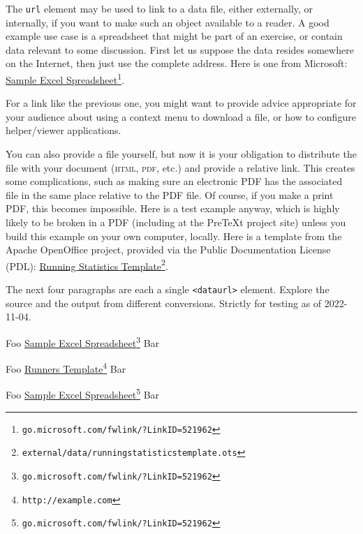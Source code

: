 \documentclass{sn-jnl}
\theoremstyle{thmstyleone}%
\theoremstyle{thmstyletwo}%
\theoremstyle{thmstylethree}%
\newcommand{\mono}[1]{\texttt{#1}}
\newcommand{\initialism}[1]{\textsc{\MakeLowercase{#1}}}
\numberwithin{equation}{section}
\begin{document}
The \mono{url} element may be used to link to a data file, either externally, or internally, if you want to make such an object available to a reader.  A good example use case is a spreadsheet that might be part of an exercise, or contain data relevant to some discussion.  First let us suppose the data resides somewhere on the Internet, then just use the complete address.  Here is one from Microsoft: \href{http://go.microsoft.com/fwlink/?LinkID=521962}{Sample Excel Spreadsheet}\footnote{\nolinkurl{go.microsoft.com/fwlink/?LinkID=521962}\label{section-cross-referencing-16-5}}.%
\par
For a link like the previous one, you might want to provide advice appropriate for your audience about using a context menu to download a file, or how to configure helper\slash{}viewer applications.%
\par
You can also provide a file yourself, but now it is your obligation to distribute the file with your document (\initialism{HTML}, \initialism{PDF}, etc.\@) and provide a relative link.  This creates some complications, such as making sure an electronic PDF has the associated file in the same place relative to the PDF file.  Of course, if you make a print PDF, this becomes impossible.  Here is a test example anyway, which is highly likely to be broken in a PDF (including at the PreTeXt project site) unless you build this example on your own computer, locally.  Here is a template from the Apache OpenOffice project, provided via the Public Documentation License (PDL):  \href{external/data/runningstatisticstemplate.ots}{Running Statistics Template}\footnote{\nolinkurl{external/data/runningstatisticstemplate.ots}\label{section-cross-referencing-18-6}}.%
\par
The next four paragraphs are each a single \mono{<dataurl>} element.  Explore the source and the output from different conversions.  Strictly for testing as of 2022-11-04.%
\par
Foo \href{http://go.microsoft.com/fwlink/?LinkID=521962}{Sample Excel Spreadsheet}\footnote{\nolinkurl{go.microsoft.com/fwlink/?LinkID=521962}\label{section-cross-referencing-20-2}} Bar%
\par
Foo \href{https://pretextbook.org/examples/sample-article/html/external/data/runningstatisticstemplate.ots}{Runners Template}\footnote{\nolinkurl{http://example.com}\label{section-cross-referencing-21-2}} Bar%
\par
Foo \href{http://go.microsoft.com/fwlink/?LinkID=521962}{Sample Excel Spreadsheet}\footnote{\nolinkurl{go.microsoft.com/fwlink/?LinkID=521962}\label{section-cross-referencing-22-2}} Bar%
\end{document}
